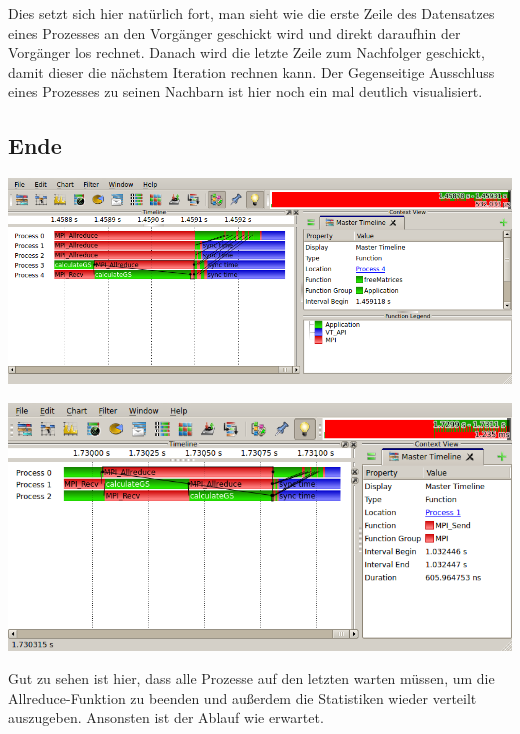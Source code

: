\documentclass[a4paper]{article}
\begin{document}
Dies setzt sich hier natürlich fort, man sieht wie die erste Zeile des Datensatzes eines Prozesses an den Vorgänger geschickt wird und direkt daraufhin der Vorgänger los rechnet. Danach wird die letzte Zeile zum Nachfolger geschickt, damit dieser die nächstem Iteration rechnen kann. Der Gegenseitige Ausschluss eines Prozesses zu seinen Nachbarn ist hier noch ein mal deutlich visualisiert.
\subsection{Ende}
\includegraphics[scale=0.9]{img/gs_5_4_end1.png}

\includegraphics[scale=0.9]{img/gs_3_2_end.png}

Gut zu sehen ist hier, dass alle Prozesse auf den letzten warten müssen, um die Allreduce-Funktion zu beenden und außerdem die Statistiken wieder verteilt auszugeben. Ansonsten ist der Ablauf wie erwartet.
\end{document}
